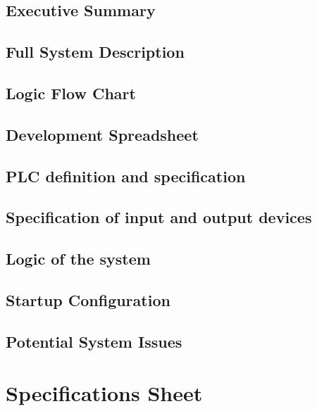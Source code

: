 \documentclass[12pt]{report}
\let\oldchapter\chapter%
\renewcommand{\chapter}{\cleardoublepage\oldchapter}%
\begin{document}
	\newpage
    

	\section{Executive Summary}
    
    \newpage
   
    \section{Full System Description} 
    
    
    \section{Logic Flow Chart}
    

    \section{Development Spreadsheet}
    
    
    \section{PLC definition and specification}
    
    
    \section{Specification of input and output devices}
    
    
    \section{Logic of the system}
    
    
    \section{Startup Configuration}
    
    
    \section{Potential System Issues}
    
    
    \appendix
    \chapter{Specifications Sheet}
    
    
\end{document}
